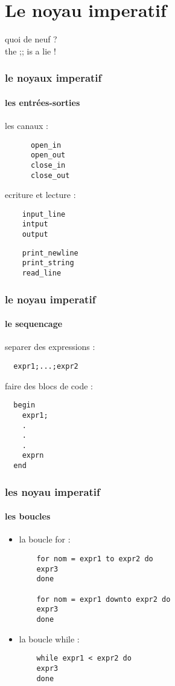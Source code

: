 \section{Le noyau imperatif}

\begin{frame}
quoi de neuf ? \\
the ;; is a lie !
\end{frame}

\begin{frame}[fragile]
  \frametitle{le noyaux imperatif}
  \framesubtitle{les entrées-sorties}
  les canaux : 
  \begin{lstlisting}
      open_in
      open_out
      close_in
      close_out
   \end{lstlisting}
    ecriture et lecture :
  \begin{minipage}[t]{4cm}
   \begin{lstlisting}
    input_line
    intput
    output
   \end{lstlisting}
  \end{minipage}
  \begin{minipage}[t]{4cm}
   \begin{lstlisting}
    print_newline
    print_string
    read_line
   \end{lstlisting}
  \end{minipage}
\end{frame}

\begin{frame}[fragile]
  \frametitle{le noyau imperatif}
  \framesubtitle{le sequencage}
  separer des expressions :
  \begin{lstlisting}
  expr1;...;expr2
  \end{lstlisting}
  faire des blocs de code :
  \begin{lstlisting}
  begin
    expr1; 
    .
    .
    .
    exprn
  end
  \end{lstlisting}
\end{frame}

\begin{frame}[fragile]
    \frametitle{les noyau imperatif}
    \framesubtitle{les boucles}
    \begin{itemize}
      \item
	la boucle for :
	\begin{lstlisting}
	for nom = expr1 to expr2 do 
	expr3
	done

	for nom = expr1 downto expr2 do
	expr3
	done
	\end{lstlisting}
      \item
	la boucle while :
	\begin{lstlisting}
	while expr1 < expr2 do
	expr3
	done
      \end{lstlisting}
  \end{itemize}
\end{frame}
